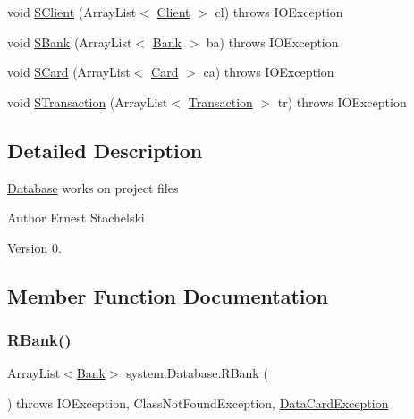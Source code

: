 \begin{DoxyCompactItemize}
\item 
void \mbox{\hyperlink{classsystem_1_1_database_a64a050b14b8bb4b3dcecb34921291099}{S\+Client}} (Array\+List$<$ \mbox{\hyperlink{classmodules_1_1_client}{Client}} $>$ cl)  throws I\+O\+Exception 
\item 
void \mbox{\hyperlink{classsystem_1_1_database_ab4e8d37f1334b4a6f4ff60ab6c743ee3}{S\+Bank}} (Array\+List$<$ \mbox{\hyperlink{classmodules_1_1bank_1_1_bank}{Bank}} $>$ ba)  throws I\+O\+Exception
\item 
void \mbox{\hyperlink{classsystem_1_1_database_a94a0d7fe7179035d06ab24bf07968543}{S\+Card}} (Array\+List$<$ \mbox{\hyperlink{classmodules_1_1bank_1_1_card}{Card}} $>$ ca)  throws I\+O\+Exception 
\item 
void \mbox{\hyperlink{classsystem_1_1_database_a1a8335a4171ef7faf63e803fb844d7a0}{S\+Transaction}} (Array\+List$<$ \mbox{\hyperlink{classmodules_1_1center_1_1_transaction}{Transaction}} $>$ tr)  throws I\+O\+Exception 
\end{DoxyCompactItemize}


\subsection{Detailed Description}
\mbox{\hyperlink{classsystem_1_1_database}{Database}} works on project files \begin{DoxyAuthor}{Author}
Ernest Stachelski 
\end{DoxyAuthor}
\begin{DoxyVersion}{Version}
0. 
\end{DoxyVersion}


\subsection{Member Function Documentation}
\mbox{\label{classsystem_1_1_database_a1cd62e343cf922e01a0c78507793797d}} 
\subsubsection{\texorpdfstring{R\+Bank()}{RBank()}}
{\footnotesize\ttfamily Array\+List$<$\mbox{\hyperlink{classmodules_1_1bank_1_1_bank}{Bank}}$>$ system.\+Database.\+R\+Bank (\begin{DoxyParamCaption}{ }\end{DoxyParamCaption}) throws I\+O\+Exception, Class\+Not\+Found\+Exception, \mbox{\hyperlink{classsystem_1_1exceptions_1_1_data_card_exception}{Data\+Card\+Exception}}\hspace{0.3cm}{\ttfamily [inline]}}

